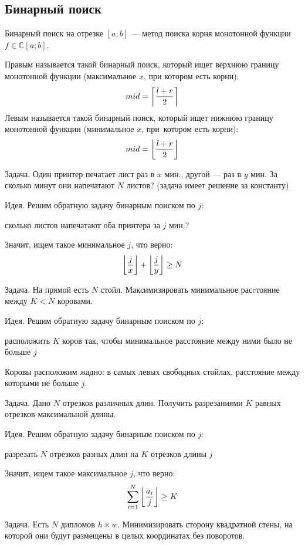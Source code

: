 \newpage
\subsection{Бинарный поиск}

{\bold Бинарный поиск} на отрезке $[a;b]$ --- метод поиска корня монотонной функции $f\in\mathbb{C}[a;b]$. 

{\bold Правым} называется такой бинарный поиск, который ищет {\ital верхнюю границу} монотонной функции {\ital\color{desc}(максимальное $x$, при котором есть корни)}:
$$mid=\left\lceil\frac{l+r}{2}\right\rceil$$
{\bold Левым} называется такой бинарный поиск, который ищет {\ital нижнюю границу} монотонной функции {\ital\color{desc}(минимальное $x$, при~котором есть корни)}:
$$mid=\left\lfloor\frac{l+r}{2}\right\rfloor$$
\begin{theorem}
{\bold Задача.} Один принтер печатает лист раз в $x$ мин., другой --- раз в $y$ мин. За сколько минут они напечатают $N$ листов? {\ital\color{desc}(задача имеет решение за константу)}
\end{theorem}

{\bold Идея.} Решим обратную задачу бинарным поиском по $j$:
\begin{list*}
\item сколько листов напечатают оба принтера за $j$ мин.?
\end{list*}
Значит, ищем такое минимальное $j$, что верно:
$$\left\lfloor\frac{j}{x}\right\rfloor+\left\lfloor\frac{j}{y}\right\rfloor\geq N$$
\begin{theorem}
{\bold Задача.} На прямой есть $N$ стойл. Максимизировать минимальное расcтояние между $K\less N$ коровами.
\end{theorem}

{\bold Идея.} Решим обратную задачу бинарным поиском по $j$:
\begin{list*}
\item расположить $K$ коров так, чтобы минимальное расстояние между ними было не больше $j$ 
\end{list*}
Коровы расположим {\ital жадно}: в самых левых свободных стойлах, расстояние между которыми {\ital не больше} $j$.

\begin{theorem}
{\bold Задача.} Дано $N$ отрезков различных длин. Получить разрезаниями $K$ равных отрезков максимальной длины.
\end{theorem}

{\bold Идея.} Решим обратную задачу бинарным поиском по $j$:
\begin{list*}
\item разрезать $N$ отрезков разных длин на $K$ отрезков длины $j$
\end{list*}
Значит, ищем такое максимальное $j$, что верно:
$$\sum_{i=1}^N\left\lfloor\frac{a_i}{j}\right\rfloor\geq K$$
\begin{theorem}
{\bold Задача.} Есть $N$ дипломов $h\times w$. Минимизировать сторону квадратной стены, на которой они будут размещены в целых координатах без поворотов.
\end{theorem}

